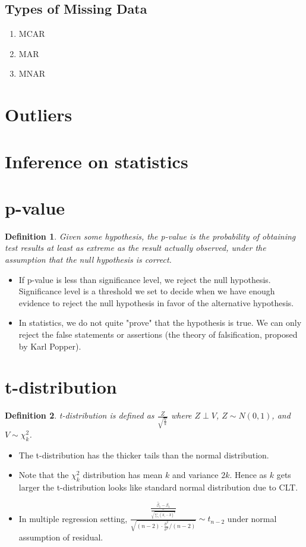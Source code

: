 \documentclass[11pt,reqno]{amsart}
\newtheorem{definition}{Definition}
\theoremstyle{remark}
\begin{document}
\subsection{Types of Missing Data}
\begin{enumerate}
\item MCAR
\item MAR
\item MNAR
\end{enumerate}


\section{Outliers}
\section{Inference on statistics}
\section{p-value}
\begin{definition}
Given some hypothesis, the p-value is the probability of obtaining test results at least as extreme as 
the result actually observed, under the assumption that the null hypothesis is correct.
\end{definition}
\begin{itemize}
\item If p-value is less than significance level, we reject the null hypothesis. Significance 
level is a threshold we set to decide when we have enough evidence to reject the null hypothesis in favor of the alternative hypothesis.
\item In statistics, we do not quite "prove" that the hypothesis is true. We can only reject the false statements or assertions (the theory of falsification, proposed by Karl Popper). 
\end{itemize}

\section{t-distribution}
\begin{definition}
t-distribution is defined as $\frac Z{\sqrt{\frac Vk}}$ where $Z \perp V$, $Z\sim N(0,1)$, and $V\sim \chi_k^2$.
\end{definition}
\begin{itemize}
\item The t-distribution has the thicker tails than the normal distribution.
\item Note that the $\chi_k^2$ distribution has mean $k$ and variance $2k$. Hence as $k$ gets larger the t-distribution 
looks like standard normal distribution due to CLT. 
\item In multiple regression setting, $\frac{\frac{\hat\beta_1-\beta_1}{\frac \sigma{\sqrt{\sum_i(X_i-\bar X)^2}}}}
{\sqrt{(n-2)\cdot\frac{\hat \sigma^2}{\sigma^2}/(n-2)}}\sim t_{n-2}$ under normal assumption of residual.
\end{itemize}
\end{document}
